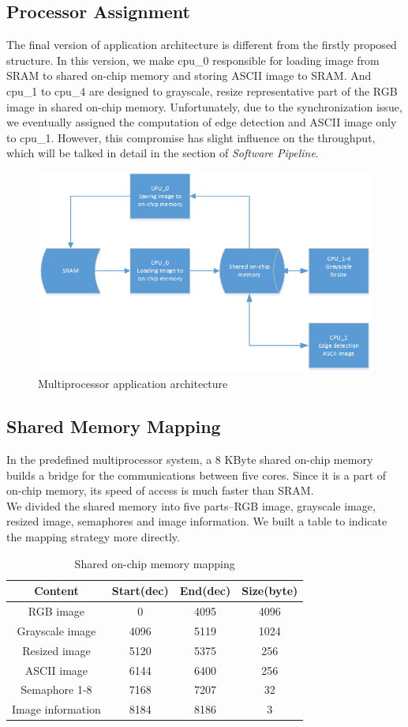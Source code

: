 \documentclass[conference]{IEEEtran}
\begin{document}
\subsection{Processor Assignment}
The final version of application architecture is different from the firstly proposed structure. In this version, we make cpu\_0 responsible for loading image from SRAM to shared on-chip memory and storing ASCII image to SRAM. And cpu\_1 to cpu\_4 are designed to grayscale, resize representative part of the RGB image in shared on-chip memory. Unfortunately, due to the synchronization issue, we eventually assigned the computation of edge detection and ASCII image only to cpu\_1. However, this compromise has slight influence on the throughput, which will be talked in detail in the section of \emph{Software Pipeline}.
\begin{figure}
	\centering
	\includegraphics[scale=1]{mparch.png}
	\caption{Multiprocessor application architecture}
	\label{fg:mpapp}
\end{figure}
\subsection{Shared Memory Mapping}
In the predefined multiprocessor system, a 8 KByte shared on-chip memory builds a bridge for the communications between five cores. Since it is a part of on-chip memory, its speed of access is much faster than SRAM.\\
\indent
We divided the shared memory into five parts--RGB image, grayscale image, resized image, semaphores and image information. We built a table to indicate the mapping strategy more directly.
\begin{table}
	\centering
	\caption{Shared on-chip memory mapping}
	\label{tab:Mapping}
	\begin{tabular}{cccc}
		\toprule
		Content&Start(dec)&End(dec)&Size(byte)\\
		\midrule
		RGB image&0&4095&4096\\
		Grayscale image&4096&5119&1024\\
		Resized image&5120&5375&256\\
		ASCII image&6144&6400&256\\
		Semaphore 1-8 &7168&7207&32\\
		Image information&8184&8186&3\\
		\bottomrule
	\end{tabular}
\end{table}
\end{document}
